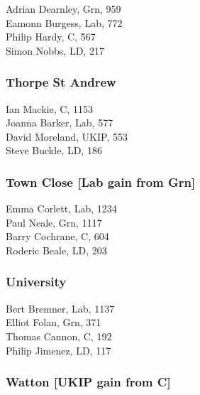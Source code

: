 \documentclass[a4paper,openany,10pt]{book}
\begin{document}


Adrian Dearnley, Grn, 959\\
Eamonn Burgess, Lab, 772\\
Philip Hardy, C, 567\\
Simon Nobbs, LD, 217\\


\subsubsection*{Thorpe St Andrew}



Ian Mackie, C, 1153\\
Joanna Barker, Lab, 577\\
David Moreland, UKIP, 553\\
Steve Buckle, LD, 186\\


\subsubsection*{Town Close \hspace*{\fill}\nolinebreak[1]%
\enspace\hspace*{\fill}
[Lab gain from Grn]}



Emma Corlett, Lab, 1234\\
Paul Neale, Grn, 1117\\
Barry Cochrane, C, 604\\
Roderic Beale, LD, 203\\


\subsubsection*{University}



Bert Bremner, Lab, 1137\\
Elliot Folan, Grn, 371\\
Thomas Cannon, C, 192\\
Philip Jimenez, LD, 117\\


\subsubsection*{Watton \hspace*{\fill}\nolinebreak[1]%
\enspace\hspace*{\fill}
[UKIP gain from C]}
\end{document}
